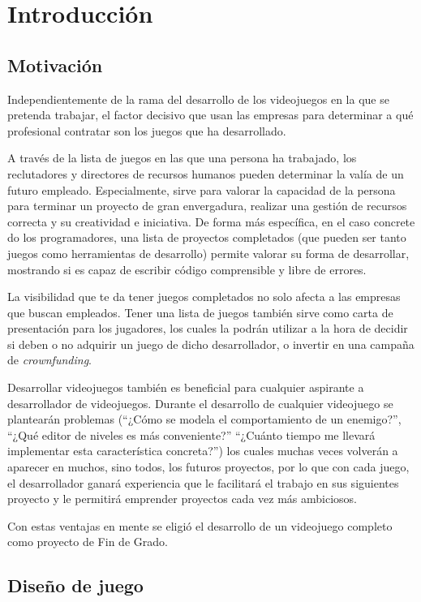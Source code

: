 \chapter{Introducción}
\label{chap:introducción}
\section{Motivación}
Independientemente de la rama del desarrollo de los videojuegos en la que se pretenda trabajar, el factor decisivo que usan las empresas para determinar a qué profesional contratar son los juegos que ha desarrollado\cite{breaking_game_industry}. 

A través de la lista de juegos en las que una persona ha trabajado, los reclutadores y directores de recursos humanos pueden determinar la valía de un futuro empleado. Especialmente, sirve para valorar la capacidad de la persona para terminar un proyecto de gran envergadura, realizar una gestión de recursos correcta y su creatividad e iniciativa. De forma más específica, en el caso concrete do los programadores, una lista de proyectos completados (que pueden ser tanto juegos como herramientas de desarrollo) permite valorar su forma de desarrollar, mostrando si es capaz de escribir código comprensible y libre de errores.

La visibilidad que te da tener juegos completados no solo afecta a las empresas que buscan empleados. Tener una lista de juegos también sirve como carta de presentación para los jugadores, los cuales la podrán utilizar a la hora de decidir si deben o no adquirir un juego de dicho desarrollador, o invertir en una campaña de \textit{crownfunding}.

Desarrollar videojuegos también es beneficial para cualquier aspirante a desarrollador de videojuegos. Durante el desarrollo de cualquier videojuego se plantearán problemas (``¿Cómo se modela el comportamiento de un enemigo?'', ``¿Qué editor de niveles es más conveniente?'' ``¿Cuánto tiempo me llevará implementar esta característica concreta?'') los cuales muchas veces volverán a aparecer en muchos, sino todos, los futuros proyectos, por lo que con cada juego, el desarrollador ganará experiencia que le facilitará el trabajo en sus siguientes proyecto y le permitirá emprender proyectos cada vez más ambiciosos. 

Con estas ventajas en mente se eligió el desarrollo de un videojuego completo como proyecto de Fin de Grado.

\section{Diseño de juego}
